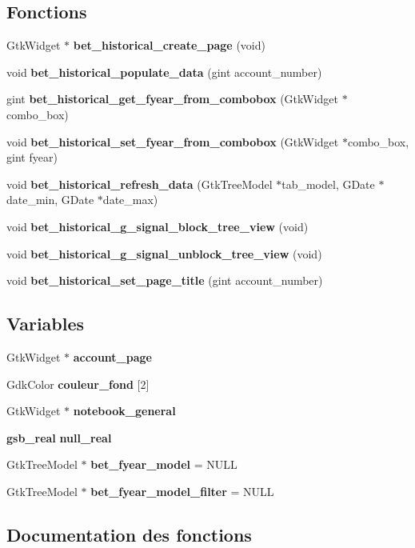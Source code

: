 \subsection*{Fonctions}
\begin{DoxyCompactItemize}
\item 
GtkWidget $\ast$ {\bf bet\_\-historical\_\-create\_\-page} (void)
\item 
void {\bf bet\_\-historical\_\-populate\_\-data} (gint account\_\-number)
\item 
gint {\bf bet\_\-historical\_\-get\_\-fyear\_\-from\_\-combobox} (GtkWidget $\ast$combo\_\-box)
\item 
void {\bf bet\_\-historical\_\-set\_\-fyear\_\-from\_\-combobox} (GtkWidget $\ast$combo\_\-box, gint fyear)
\item 
void {\bf bet\_\-historical\_\-refresh\_\-data} (GtkTreeModel $\ast$tab\_\-model, GDate $\ast$date\_\-min, GDate $\ast$date\_\-max)
\item 
void {\bf bet\_\-historical\_\-g\_\-signal\_\-block\_\-tree\_\-view} (void)
\item 
void {\bf bet\_\-historical\_\-g\_\-signal\_\-unblock\_\-tree\_\-view} (void)
\item 
void {\bf bet\_\-historical\_\-set\_\-page\_\-title} (gint account\_\-number)
\end{DoxyCompactItemize}
\subsection*{Variables}
\begin{DoxyCompactItemize}
\item 
GtkWidget $\ast$ {\bf account\_\-page}
\item 
GdkColor {\bf couleur\_\-fond} [2]
\item 
GtkWidget $\ast$ {\bf notebook\_\-general}
\item 
{\bf gsb\_\-real} {\bf null\_\-real}
\item 
GtkTreeModel $\ast$ {\bf bet\_\-fyear\_\-model} = NULL
\item 
GtkTreeModel $\ast$ {\bf bet\_\-fyear\_\-model\_\-filter} = NULL
\end{DoxyCompactItemize}


\subsection{Documentation des fonctions}
